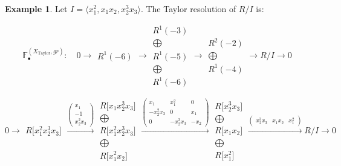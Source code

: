 \documentclass[paper=a4, fontsize=11pt]{scrartcl} %
\theoremstyle{plain}
\theoremstyle{definition}
\newtheorem{exmp}[thm]{Example}
\begin{document}
\begin{exmp}
Let $I = \langle x_{1}^2, x_{1} x_{2}, x_{2}^3 x_{3} \rangle$. The Taylor resolution of $R/I$ is:

$$
\mathbb{F}_{\bullet}^{(X_{\text{Taylor}},gr)}: \quad 0 \rightarrow \begin{matrix}
R^{1}(-6)
\end{matrix}
\rightarrow\begin{matrix}
R^{1}(-3)\\ \bigoplus \\
R^{1}(-5)\\ \bigoplus \\
R^{1}(-6)
\end{matrix}
\rightarrow\begin{matrix}
R^{2}(-2)\\ \bigoplus \\
R^{1}(-4)
\end{matrix}
\rightarrow R/I \rightarrow 0
$$

$$
0 \rightarrow \begin{matrix}
R \lbrack x_{1}^{2}x_{2}^{3}x_{3} \rbrack
\end{matrix}
\xrightarrow{\left( \begin{matrix}
x_{1} \\
-1 \\
x_{2}^{2}x_{3}
\end{matrix} \right)}\begin{matrix}
R \lbrack x_{1}x_{2}^{3}x_{3} \rbrack \\ \bigoplus \\
R \lbrack x_{1}^{2}x_{2}^{3}x_{3} \rbrack \\ \bigoplus \\
R \lbrack x_{1}^{2}x_{2} \rbrack
\end{matrix}
\xrightarrow{\left( \begin{matrix}
x_{1} & x_{1}^{2} & 0 \\
-x_{2}^{2}x_{3} & 0 & x_{1} \\
0 & -x_{2}^{3}x_{3} & -x_{2}
\end{matrix} \right)}\begin{matrix}
R \lbrack x_{2}^{3}x_{3} \rbrack \\ \bigoplus \\
R \lbrack x_{1}x_{2} \rbrack \\ \bigoplus \\
R \lbrack x_{1}^{2} \rbrack
\end{matrix}
\xrightarrow{\left( \begin{matrix}
x_{2}^{3}x_{3} & x_{1}x_{2} & x_{1}^{2}
\end{matrix} \right)} R/I \rightarrow 0
$$


\end{exmp}
\end{document}
